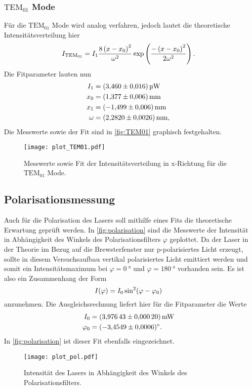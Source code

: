 \subsubsection{$\text{TEM}_{01}$ Mode}
Für die $\text{TEM}_{01}$ Mode wird analog verfahren, jedoch lautet die theoretische Intensitätsverteilung hier
\begin{equation}
  \notag
  I_{\text{TEM}_{01}} = I_1 \frac{8\left( x - x_0\right)^2}{\omega^2} \exp \left( \frac{-\left(x - x_0\right)^2}{2\omega^2} \right).
\end{equation}
Die Fitparameter lauten nun
\begin{align*}
  I_1 &=\qty{3.460+-0.016}{\micro\watt} \\
  x_0 &=\qty{1.377+-0.006}{\milli\metre}   \\
  x_1 &=\qty{-1.499+-0.006}{\milli\metre}   \\
 \omega &=\qty{2.2820+-0.0026}{\milli\metre},
\end{align*}
Die Messwerte sowie der Fit sind in \autoref{fig:TEM01} graphisch festgehalten.
\begin{figure}[H]
  \centering
  \texttt{[image: plot\_TEM01.pdf]}
  \caption{Messwerte sowie Fit der Intensitätsverteilung in x-Richtung für die $\text{TEM}_{01}$ Mode.}
  \label{fig:TEM01}
\end{figure}

\subsection{Polarisationsmessung}
Auch für die Polarisation des Lasers soll mithilfe eines Fits die theoretische Erwartung geprüft werden.
In \autoref{fig:polarisation} sind die Messwerte der Intensität in Abhängigkeit des Winkels des Polarisationsfilters $\varphi$
geplottet.
Da der Laser in der Theorie im Bezug auf die Brewsterfenster nur p-polarisiertes Licht erzeugt, sollte in diesem
Versuchsaufbau vertikal polarisiertes Licht emittiert werden und somit ein Intensitätsmaximum bei $\varphi = \qty{0}{\degree}$ und
$\varphi = \qty{180}{\degree}$ vorhanden sein.
Es ist also ein Zusammenhang der Form
\begin{equation}
  \notag
  I(\varphi) = I_0 \sin^2\!\left(\varphi-\varphi_0\right)
\end{equation}
anzunehmen. Die Ausgleichsrechnung liefert hier für die Fitparameter die Werte
\begin{align*}
  I_0 &=\qty{3.97643+-0.00020}{\milli\watt} \\
 \varphi_0 &=\qty{-3.4549+-0.0006}{\degree}.
\end{align*}
In \autoref{fig:polarisation} ist dieser Fit ebenfalls eingezeichnet.
\begin{figure}[H]
  \centering
  \texttt{[image: plot\_pol.pdf]}
  \caption{Intensität des Lasers in Abhängigkeit des Winkels des Polarisationsfilters.}
  \label{fig:polarisation}
\end{figure}

